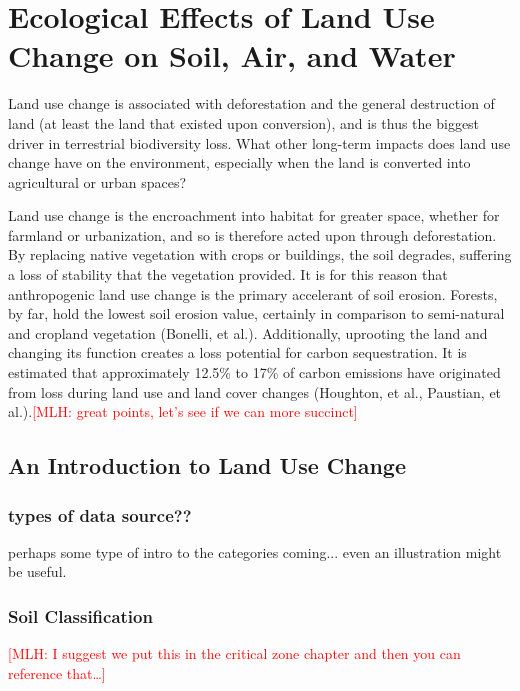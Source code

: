 \documentclass{book}\usepackage{knitr}
\newcommand{\red}[1]{\textcolor{red}{[MLH: #1]}}
\begin{document}
\section{Ecological Effects of Land Use Change on Soil, Air, and Water}

Land use change is associated with deforestation and the general destruction of land (at least the land that existed upon conversion), and is thus the biggest driver in terrestrial biodiversity loss. What other long-term impacts does land use change have on the environment, especially when the land is converted into agricultural or urban spaces?

Land use change is the encroachment into habitat for greater space, whether for farmland or urbanization, and so is therefore acted upon through deforestation. By replacing native vegetation with crops or buildings, the soil degrades, suffering a loss of stability that the vegetation provided. It is for this reason that anthropogenic land use change is the primary accelerant of soil erosion. Forests, by far, hold the lowest soil erosion value, certainly in comparison to semi-natural and cropland vegetation (Bonelli, et al.). Additionally, uprooting the land and changing its function creates  a loss potential for carbon sequestration. It is estimated that approximately 12.5\% to 17\% of carbon emissions have originated from loss during land use and land cover changes (Houghton, et al., Paustian, et al.).\red{great points, let's see if we can more succinct}

\subsection{An Introduction to Land Use Change}

\subsubsection{types of data source??}

perhaps some type of intro to the categories coming... even an illustration might be useful. 

\subsubsection{Soil Classification}\red{I suggest we put this in the critical zone chapter and then you can reference that\ldots}
\end{document}
